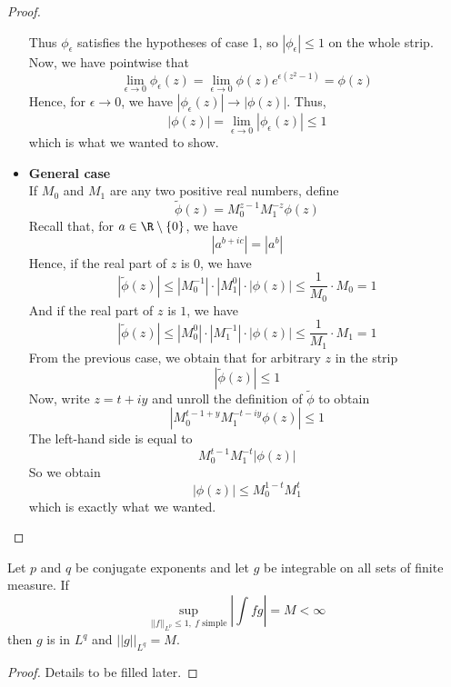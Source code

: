 \begin{proof}
\begin{itemize}
{        Thus $\phi_{\epsilon}$ satisfies the hypotheses of case 1, so $|\phi_{\epsilon}| \leq 1$ on the whole strip.\\
        Now, we have pointwise that
        \[\lim_{\epsilon \to 0} \phi_{\epsilon}(z) = \lim_{\epsilon \to 0} \phi(z) e^{\epsilon(z^2-1)} = \phi(z)\]
        Hence, for $\epsilon \to 0$, we have $|\phi_{\epsilon}(z)| \to |\phi(z)|$.
        Thus,
        \[ |\phi(z)| = \lim_{\epsilon \to 0} |\phi_{\epsilon}(z)| \leq 1 \]
        which is what we wanted to show.
        }
        \item{ \textbf{General case}\\
        If $M_0$ and $M_1$ are any two positive real numbers, define
        \[ \tilde{\phi} (z) = M_0 ^{z-1} M_1^{-z} \phi(z) \]
        Recall that, for $a\in \R\setminus\{0\}$, we have
        \[ |a^{b+ic}| = |a^b| \]
        Hence, if the real part of $z$ is $0$, we have
        \[ |\tilde{\phi} (z)| \leq |M_0^{-1}| \cdot |M_1^0| \cdot |\phi(z)| \leq \frac{1}{M_0} \cdot M_0 = 1 \]
        And if the real part of $z$ is $1$, we have
        \[ |\tilde{\phi} (z)| \leq |M_0^0| \cdot |M_1^{-1}| \cdot |\phi(z)| \leq \frac{1}{M_1} \cdot M_1 = 1 \]
        From the previous case, we obtain that for arbitrary $z$ in the strip
        \[ |\tilde{\phi} (z)| \leq 1 \]
        Now, write $z= t + iy$ and unroll the definition of $\tilde{\phi}$ to obtain
        \[ |M_0^{t-1+y} M_1^{-t-iy} \phi(z)| \leq 1 \]
        The left-hand side is equal to
        \[ M_0^{t-1} M_1^{-t} |\phi(z)| \]
        So we obtain
        \[|\phi(z)| \leq M_0^{1-t} M_1^t\]
        which is exactly what we wanted.
        }
    \end{itemize}
\end{proof}


\begin{lemma}
    \label{lem:lp_of_sup_norm}
    \uses{}
    \lean{}
    Let $p$ and $q$ be conjugate exponents and let $g$ be integrable on all sets of finite measure. If
    \[ \sup_{||f||_{L^p} \leq 1, \ f \text{ simple}} \left| \int fg \right| = M < \infty \]
    then $g$ is in $L^q$ and $||g||_{L^q} = M$.
    \end{lemma}
      \begin{proof}
      Details to be filled later.
      \end{proof}

